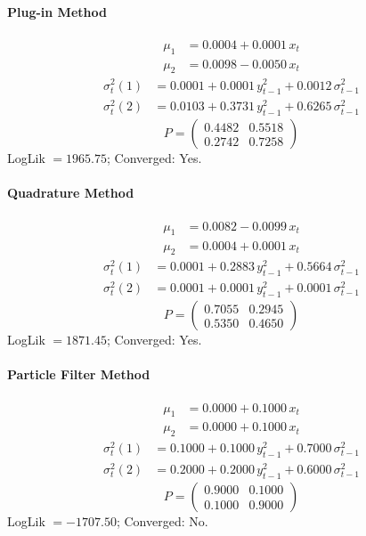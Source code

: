 \documentclass[11pt, a4paper]{article}
\begin{document}
\paragraph{Plug-in Method}
\begin{align}
\mu_{1} &= 0.0004 + 0.0001\, x_t \\
\mu_{2} &= 0.0098 -0.0050\, x_t
\end{align}
\begin{align}
\sigma^2_{t}(1) &= 0.0001 + 0.0001\, y_{t-1}^2 + 0.0012\, \sigma^2_{t-1} \\
\sigma^2_{t}(2) &= 0.0103 + 0.3731\, y_{t-1}^2 + 0.6265\, \sigma^2_{t-1}
\end{align}
\begin{equation}
P = \begin{pmatrix} 0.4482 & 0.5518 \\ 0.2742 & 0.7258 \end{pmatrix}
\end{equation}
LogLik $= 1965.75$; Converged: Yes.

\paragraph{Quadrature Method}
\begin{align}
\mu_{1} &= 0.0082 -0.0099\, x_t \\
\mu_{2} &= 0.0004 + 0.0001\, x_t
\end{align}
\begin{align}
\sigma^2_{t}(1) &= 0.0001 + 0.2883\, y_{t-1}^2 + 0.5664\, \sigma^2_{t-1} \\
\sigma^2_{t}(2) &= 0.0001 + 0.0001\, y_{t-1}^2 + 0.0001\, \sigma^2_{t-1}
\end{align}
\begin{equation}
P = \begin{pmatrix} 0.7055 & 0.2945 \\ 0.5350 & 0.4650 \end{pmatrix}
\end{equation}
LogLik $= 1871.45$; Converged: Yes.

\paragraph{Particle Filter Method}
\begin{align}
\mu_{1} &= 0.0000 + 0.1000\, x_t \\
\mu_{2} &= 0.0000 + 0.1000\, x_t
\end{align}
\begin{align}
\sigma^2_{t}(1) &= 0.1000 + 0.1000\, y_{t-1}^2 + 0.7000\, \sigma^2_{t-1} \\
\sigma^2_{t}(2) &= 0.2000 + 0.2000\, y_{t-1}^2 + 0.6000\, \sigma^2_{t-1}
\end{align}
\begin{equation}
P = \begin{pmatrix} 0.9000 & 0.1000 \\ 0.1000 & 0.9000 \end{pmatrix}
\end{equation}
LogLik $= -1707.50$; Converged: No.
\end{document}
